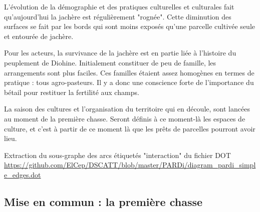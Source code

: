 L'évolution de la démographie et des pratiques culturelles et culturales fait qu'aujourd'hui la jachère est régulièrement "rognée". Cette diminution des surfaces se fait par les bords qui sont moins exposés qu'une parcelle cultivée seule et entourée de jachère.

Pour les acteurs, la survivance de la jachère est en partie liée à l'histoire du peuplement de Diohine. Initialement constituer de peu de famille, les arrangements sont plus faciles. Ces familles étaient assez homogènes en termes de pratique : tous agro-pasteurs. Il y a donc une conscience forte de l'importance du bétail pour restituer la fertilité aux champs.

La saison des cultures et l'organisation du territoire qui en découle, sont lancées au moment de la première chasse. Seront définis à ce moment-là les espaces de culture, et c'est à partir de ce moment là que les prêts de parcelles pourront avoir lieu.

Extraction du sous-graphe des arcs étiquetés  "interaction" du fichier DOT \url{https://github.com/ElCep/DSCATT/blob/master/PARDi/diagram_pardi_simple_edges.dot}

 \subsection{Mise en commun : la première chasse}\label{sec:premierchasse}


